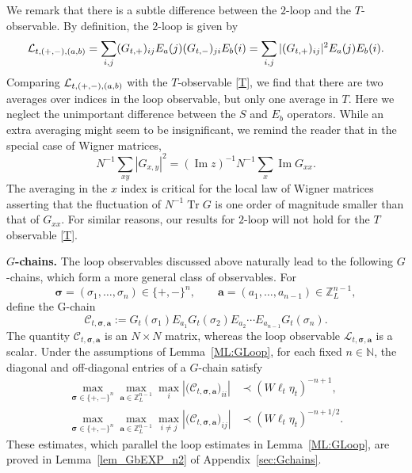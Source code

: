 \documentclass[10pt,reqno]{article}
\DeclareMathOperator{\im}{{\mathrm{Im}}}
\DeclareMathOperator{\tr}{Tr}
\theoremstyle{plain} %
\theoremstyle{remark}
\numberwithin{equation}{section}
\begin{document}
We remark that there is a  subtle difference between the $2$-loop and the  $T$-observable. 
By definition, the $2$-loop is given by 
$$
{\cal L}_{t, (+,-),(a,b)}= \sum_{i, j}   (G_{t,+})_{ij}  E_a(j) (G_{t,-})_{ji}   E_b(i)=  \sum_{i, j}   |(G_{t,+})_{ij}|^2  E_a(j) E_b(i).
$$
Comparing ${\cal L}_{t, (+,-),(a,b)}$ with the $T$-observable \eqref{T}, we find that there are two averages over indices in the loop observable, but only one average in $T$. Here we neglect the unimportant difference between the $S$ and $E_b$ operators.
While an extra averaging might seem to be insignificant, we remind the reader that in the special case of Wigner matrices,  
\[
N^{-1} \sum_{x y} |G_{x,y}|^2 = (\im z )^{-1}N^{-1}  \sum_x \im G_{xx}. 
\]
The averaging  in the $x$ index is critical for the local law of  Wigner matrices asserting that   the fluctuation of $N^{-1} \tr G$ is one order of magnitude smaller than that of $G_{xx}$.  For similar reasons, our results for $2$-loop will not hold for the $T$ observable \eqref{T}.

 
\noindent 
\textbf{$G$-chains.}
The loop observables discussed above naturally lead to the following $G$-chains, which form a more general class of observables. For
\[
\boldsymbol{\sigma}
   =(\sigma_1,\ldots,\sigma_n)\in\{+,-\}^n,
\qquad
\mathbf a=(a_1,\ldots,a_{n-1})\in\mathbb Z_L^{n-1},
\]
define the G-chain 
\begin{equation*} 
\mathcal C_{t,\boldsymbol{\sigma},\mathbf a}
:=
G_t(\sigma_1)E_{a_1}G_t(\sigma_2)E_{a_2}
\cdots E_{a_{n-1}}G_t(\sigma_n).
\end{equation*}
The quantity $\mathcal C_{t,\boldsymbol{\sigma},\mathbf a}$ is an $N\times N$ matrix, whereas the loop observable $\mathcal L_{t,\boldsymbol{\sigma},\mathbf a}$ is a scalar.
Under the assumptions of Lemma~\ref{ML:GLoop}, for each fixed $n\in\mathbb N$, the diagonal and off-diagonal entries of a $G$-chain satisfy
\begin{align*} 
\max_{\boldsymbol{\sigma}\in\{+,-\}^n}
\max_{\mathbf a\in\mathbb Z_L^{n-1}}
\max_i
\left|
  \bigl(\mathcal C_{t,\boldsymbol{\sigma},\mathbf a}\bigr)_{ii}
\right|
&\prec
  (W\ell_t\eta_t)^{-n+1},
\\ 
\max_{\boldsymbol{\sigma}\in\{+,-\}^n}
\max_{\mathbf a\in\mathbb Z_L^{n-1}}
\max_{i\ne j}
\left|
  \bigl(\mathcal C_{t,\boldsymbol{\sigma},\mathbf a}\bigr)_{ij}
\right|
&\prec
  (W\ell_t\eta_t)^{-n+1/2}.
\end{align*}
These estimates, which parallel the loop estimates in Lemma~\ref{ML:GLoop}, are proved in Lemma~\ref{lem_GbEXP_n2} of Appendix~\ref{sec:Gchains}.
\end{document}
